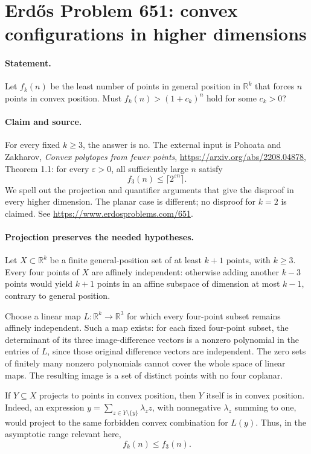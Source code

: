 \section*{Erd\H{o}s Problem 651: convex configurations in higher dimensions}

\paragraph{Statement.}
Let \(f_k(n)\) be the least number of points in general position in
\(\mathbb R^k\) that forces \(n\) points in convex position.
Must \(f_k(n)>(1+c_k)^n\) hold for some \(c_k>0\)?

\paragraph{Claim and source.}
For every fixed \(k\geq3\), the answer is no.
The external input is Pohoata and Zakharov,
\emph{Convex polytopes from fewer points},
\url{https://arxiv.org/abs/2208.04878}, Theorem 1.1:
for every \(\varepsilon>0\), all sufficiently large \(n\) satisfy
\[
 f_3(n)\leq\lceil2^{\varepsilon n}\rceil.
\]
We spell out the projection and quantifier arguments that give the
disproof in every higher dimension. The planar case is different;
no disproof for \(k=2\) is claimed.
See \url{https://www.erdosproblems.com/651}.

\paragraph{Projection preserves the needed hypotheses.}
Let \(X\subset\mathbb R^k\) be a finite general-position set of at least
\(k+1\) points, with \(k\geq3\).
Every four points of \(X\) are affinely independent: otherwise adding
another \(k-3\) points would yield \(k+1\) points in an affine subspace
of dimension at most \(k-1\), contrary to general position.

Choose a linear map \(L:\mathbb R^k\to\mathbb R^3\) for which every
four-point subset remains affinely independent. Such a map exists:
for each fixed four-point subset, the determinant of its three
image-difference vectors is a nonzero polynomial in the entries of
\(L\), since those original difference vectors are independent.
The zero sets of finitely many nonzero polynomials cannot cover
the whole space of linear maps. The resulting image is a set of
distinct points with no four coplanar.

If \(Y\subseteq X\) projects to points in convex position, then \(Y\)
itself is in convex position. Indeed, an expression
\(y=\sum_{z\in Y\setminus\{y\}}\lambda_z z\), with nonnegative
\(\lambda_z\) summing to one, would project to the same forbidden
convex combination for \(L(y)\). Thus, in the asymptotic range
relevant here,
\[
 f_k(n)\leq f_3(n).
\]


